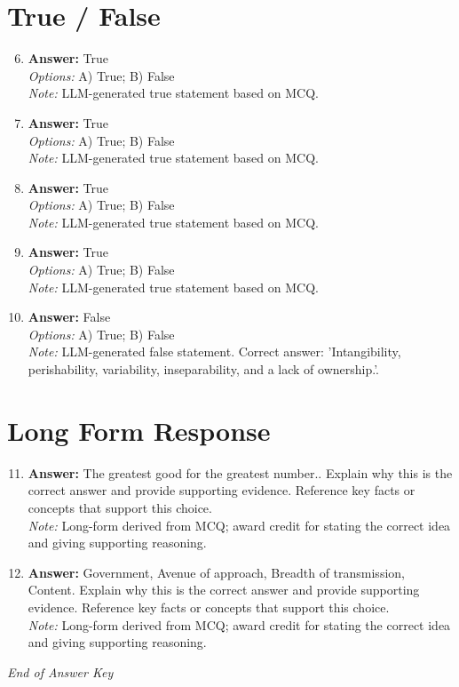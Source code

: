 \documentclass[12pt]{article}
\begin{document}
\section*{True / False}
\begin{enumerate}[label=\arabic*.]
\setcounter{enumi}{5}
\item \textbf{Answer:} True
\\ \textit{Options:} A) True; B) False
\\ \textit{Note:} LLM-generated true statement based on MCQ.
\item \textbf{Answer:} True
\\ \textit{Options:} A) True; B) False
\\ \textit{Note:} LLM-generated true statement based on MCQ.
\item \textbf{Answer:} True
\\ \textit{Options:} A) True; B) False
\\ \textit{Note:} LLM-generated true statement based on MCQ.
\item \textbf{Answer:} True
\\ \textit{Options:} A) True; B) False
\\ \textit{Note:} LLM-generated true statement based on MCQ.
\item \textbf{Answer:} False
\\ \textit{Options:} A) True; B) False
\\ \textit{Note:} LLM-generated false statement. Correct answer: 'Intangibility, perishability, variability, inseparability, and a lack of ownership.'.
\end{enumerate}

\section*{Long Form Response}
\begin{enumerate}[label=\arabic*.]
\setcounter{enumi}{10}
\item \textbf{Answer:} The greatest good for the greatest number.. Explain why this is the correct answer and provide supporting evidence. Reference key facts or concepts that support this choice.
\\ \textit{Note:} Long-form derived from MCQ; award credit for stating the correct idea and giving supporting reasoning.
\item \textbf{Answer:} Government, Avenue of approach, Breadth of transmission, Content. Explain why this is the correct answer and provide supporting evidence. Reference key facts or concepts that support this choice.
\\ \textit{Note:} Long-form derived from MCQ; award credit for stating the correct idea and giving supporting reasoning.
\end{enumerate}

\vfill
\noindent\textit{End of Answer Key}
\end{document}
